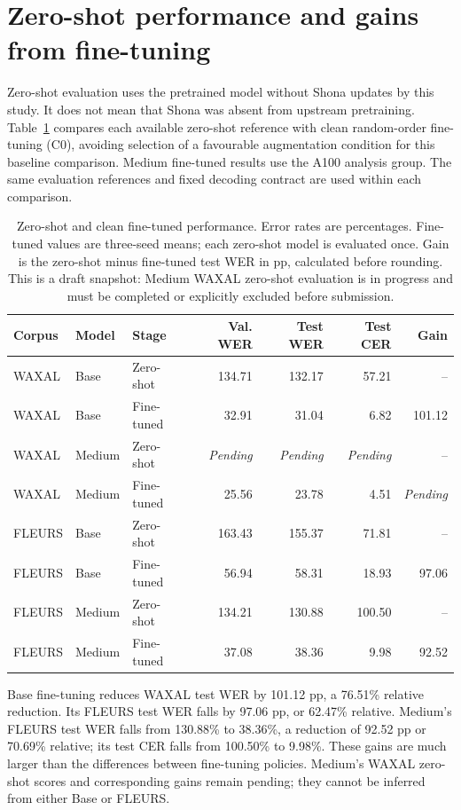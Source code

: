 \documentclass[12pt,a4paper]{report}
\begin{document}
\section{Zero-shot performance and gains from fine-tuning}
\label{sec:zero}

Zero-shot evaluation uses the pretrained model without Shona updates by this
study. It does not mean that Shona was absent from upstream pretraining.
Table~\ref{tab:zero} compares each available zero-shot reference with clean
random-order fine-tuning (C0), avoiding selection of a favourable augmentation
condition for this baseline comparison. Medium fine-tuned results use the
A100 analysis group. The same evaluation references and fixed decoding
contract are used within each comparison.

\begin{table}[htbp]\centering\small
\caption{Zero-shot and clean fine-tuned performance. Error rates are percentages.
Fine-tuned values are three-seed means; each zero-shot model is evaluated once.
Gain is the zero-shot minus fine-tuned test WER in pp, calculated before
rounding. This is a draft snapshot: Medium WAXAL zero-shot evaluation is
in progress and must be completed or explicitly excluded before submission.}
\label{tab:zero}
\setlength{\tabcolsep}{4pt}
\begin{tabular}{lllrrrr}\toprule
Corpus & Model & Stage & Val. WER & Test WER & Test CER & Gain\\\midrule
WAXAL & Base & Zero-shot & 134.71 & 132.17 & 57.21 & -- \\
WAXAL & Base & Fine-tuned & 32.91 & 31.04 & 6.82 & 101.12 \\
WAXAL & Medium & Zero-shot & \textit{Pending} & \textit{Pending} & \textit{Pending} & -- \\
WAXAL & Medium & Fine-tuned & 25.56 & 23.78 & 4.51 & \textit{Pending} \\
FLEURS & Base & Zero-shot & 163.43 & 155.37 & 71.81 & -- \\
FLEURS & Base & Fine-tuned & 56.94 & 58.31 & 18.93 & 97.06 \\
FLEURS & Medium & Zero-shot & 134.21 & 130.88 & 100.50 & -- \\
FLEURS & Medium & Fine-tuned & 37.08 & 38.36 & 9.98 & 92.52 \\
\bottomrule\end{tabular}\end{table}

Base fine-tuning reduces WAXAL test WER by 101.12 pp, a 76.51\% relative
reduction. Its FLEURS test WER falls by 97.06 pp, or 62.47\% relative.
Medium's FLEURS test WER falls from 130.88\% to 38.36\%, a reduction of
92.52 pp or 70.69\% relative; its test CER falls from 100.50\% to 9.98\%.
These gains are much larger than the differences between fine-tuning policies.
Medium's WAXAL zero-shot scores and corresponding gains remain pending;
they cannot be inferred from either Base or FLEURS.
\end{document}
